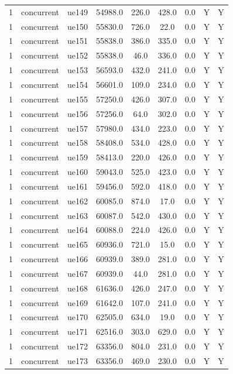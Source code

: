 \begin{table}[ht]
\begin{tabular}{|c|c|c|c|c|c|c|c|c|}
1 & concurrent & ue149 & 54988.0 & 226.0 & 428.0 & 0.0 & Y & Y \\
1 & concurrent & ue150 & 55830.0 & 726.0 & 22.0 & 0.0 & Y & Y \\
1 & concurrent & ue151 & 55838.0 & 386.0 & 335.0 & 0.0 & Y & Y \\
1 & concurrent & ue152 & 55838.0 & 46.0 & 336.0 & 0.0 & Y & Y \\
1 & concurrent & ue153 & 56593.0 & 432.0 & 241.0 & 0.0 & Y & Y \\
1 & concurrent & ue154 & 56601.0 & 109.0 & 234.0 & 0.0 & Y & Y \\
1 & concurrent & ue155 & 57250.0 & 426.0 & 307.0 & 0.0 & Y & Y \\
1 & concurrent & ue156 & 57256.0 & 64.0 & 302.0 & 0.0 & Y & Y \\
1 & concurrent & ue157 & 57980.0 & 434.0 & 223.0 & 0.0 & Y & Y \\
1 & concurrent & ue158 & 58408.0 & 534.0 & 428.0 & 0.0 & Y & Y \\
1 & concurrent & ue159 & 58413.0 & 220.0 & 426.0 & 0.0 & Y & Y \\
1 & concurrent & ue160 & 59043.0 & 525.0 & 423.0 & 0.0 & Y & Y \\
1 & concurrent & ue161 & 59456.0 & 592.0 & 418.0 & 0.0 & Y & Y \\
1 & concurrent & ue162 & 60085.0 & 874.0 & 17.0 & 0.0 & Y & Y \\
1 & concurrent & ue163 & 60087.0 & 542.0 & 430.0 & 0.0 & Y & Y \\
1 & concurrent & ue164 & 60088.0 & 224.0 & 426.0 & 0.0 & Y & Y \\
1 & concurrent & ue165 & 60936.0 & 721.0 & 15.0 & 0.0 & Y & Y \\
1 & concurrent & ue166 & 60939.0 & 389.0 & 281.0 & 0.0 & Y & Y \\
1 & concurrent & ue167 & 60939.0 & 44.0 & 281.0 & 0.0 & Y & Y \\
1 & concurrent & ue168 & 61636.0 & 426.0 & 247.0 & 0.0 & Y & Y \\
1 & concurrent & ue169 & 61642.0 & 107.0 & 241.0 & 0.0 & Y & Y \\
1 & concurrent & ue170 & 62505.0 & 634.0 & 19.0 & 0.0 & Y & Y \\
1 & concurrent & ue171 & 62516.0 & 303.0 & 629.0 & 0.0 & Y & Y \\
1 & concurrent & ue172 & 63356.0 & 804.0 & 231.0 & 0.0 & Y & Y \\
1 & concurrent & ue173 & 63356.0 & 469.0 & 230.0 & 0.0 & Y & Y \\

\end{tabular}
\end{table}
